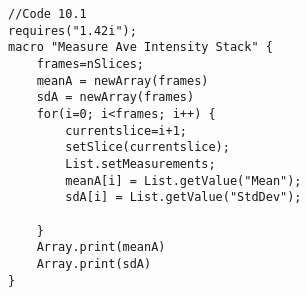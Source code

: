\begin{lstlisting}[morekeywords={*, List, setMeasurements, getValue, newArray}]
//Code 10.1
requires("1.42i");
macro "Measure Ave Intensity Stack" {
	frames=nSlices;
	meanA = newArray(frames)
	sdA = newArray(frames)
	for(i=0; i<frames; i++) {
		currentslice=i+1;
		setSlice(currentslice);
		List.setMeasurements;
		meanA[i] = List.getValue("Mean");
		sdA[i] = List.getValue("StdDev");
		
	}
	Array.print(meanA)
	Array.print(sdA)
}

\end{lstlisting}